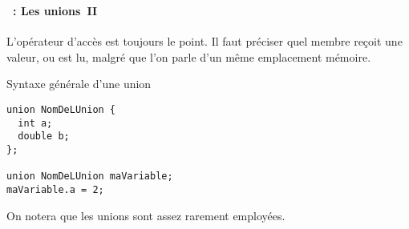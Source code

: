 \begin{frame}[containsverbatim]
  \frametitle{\secname}
  \framesubtitle{\subsecname~: Les unions~II}

  L'opérateur d'accès est toujours le point. Il faut préciser quel membre reçoit une valeur, ou est lu, malgré que
  l'on parle d'un même emplacement mémoire.
  \vspace{0.3cm}
  \begin{block}{Syntaxe générale d'une union}
    \begin{verbatim}
union NomDeLUnion {
  int a;
  double b;
};

union NomDeLUnion maVariable;
maVariable.a = 2;\end{verbatim}    
  \end{block}
  \vspace{0.3cm}
  \par
  On notera que les unions sont assez rarement employées.
\end{frame}

